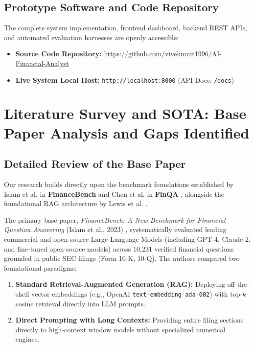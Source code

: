\documentclass[conference]{IEEEtran}
\begin{document}
\subsection{Prototype Software and Code Repository}
The complete system implementation, frontend dashboard, backend REST APIs, and automated evaluation harnesses are openly accessible:
\begin{itemize}
    \item \textbf{Source Code Repository:} \url{https://github.com/vivekmnit1996/AI-Financial-Analyst}
    \item \textbf{Live System Local Host:} \texttt{http://localhost:8000} (API Docs: \texttt{/docs})
\end{itemize}

\section{Literature Survey and SOTA: Base Paper Analysis and Gaps Identified}

\subsection{Detailed Review of the Base Paper}
Our research builds directly upon the benchmark foundations established by Islam et al. in \textbf{FinanceBench} \cite{islam2023financebench} and Chen et al. in \textbf{FinQA} \cite{chen2021finqa}, alongside the foundational RAG architecture by Lewis et al. \cite{lewis2020rag}.

The primary base paper, \textit{FinanceBench: A New Benchmark for Financial Question Answering} (Islam et al., 2023) \cite{islam2023financebench}, systematically evaluated leading commercial and open-source Large Language Models (including GPT-4, Claude-2, and fine-tuned open-source models) across 10,231 verified financial questions grounded in public SEC filings (Form 10-K, 10-Q). The authors compared two foundational paradigms:
\begin{enumerate}
    \item \textbf{Standard Retrieval-Augmented Generation (RAG):} Deploying off-the-shelf vector embeddings (e.g., OpenAI \texttt{text-embedding-ada-002}) with top-$k$ cosine retrieval directly into LLM prompts.
    \item \textbf{Direct Prompting with Long Contexts:} Providing entire filing sections directly to high-context window models without specialized numerical engines.
\end{enumerate}
\end{document}
